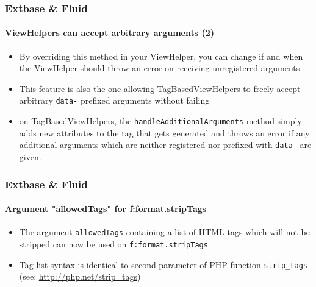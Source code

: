 
\begin{frame}[fragile]
	\frametitle{Extbase \& Fluid}
	\framesubtitle{ViewHelpers can accept arbitrary arguments (2)}

	\begin{itemize}

		\item By overriding this method in your ViewHelper, you can change if and
			when the ViewHelper should throw an error on receiving unregistered
			arguments

		\item This feature is also the one allowing TagBasedViewHelpers to freely
			accept arbitrary \texttt{data-} prefixed arguments without failing

		\item on TagBasedViewHelpers, the \texttt{handleAdditionalArguments} method
			simply adds new attributes to the tag that gets generated and throws an
			error if any additional arguments which are neither registered nor
			prefixed with \texttt{data-} are given.

	\end{itemize}

\end{frame}


\begin{frame}[fragile]
	\frametitle{Extbase \& Fluid}
	\framesubtitle{Argument "allowedTags" for f:format.stripTags}

	\begin{itemize}

		\item The argument \texttt{allowedTags} containing a list of HTML tags
			which will not be stripped can now be used on \texttt{f:format.stripTags}

		\item Tag list syntax is identical to second parameter of PHP function
			\texttt{strip\_tags} (see: \url{http://php.net/strip_tags})

	\end{itemize}

\end{frame}

